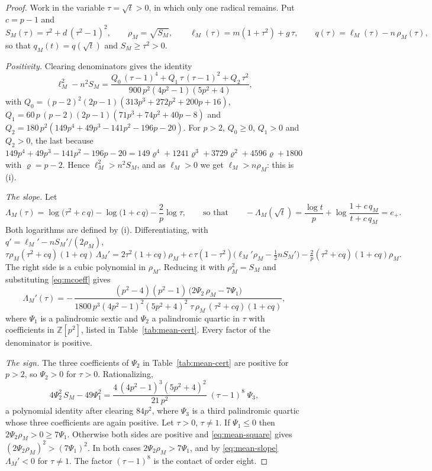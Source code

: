 \begin{proof}
Work in the variable $\tau=\sqrt t>0$, in which only one radical remains. Put $c=p-1$ and
\[ S_M(\tau)=\tau^{2}+d\,(\tau^{2}-1)^{2},\qquad \rho_M=\sqrt{S_M},\qquad
\ell_M(\tau)=m(1+\tau^{2})+g\,\tau,\qquad q(\tau)=\ell_M(\tau)-n\,\rho_M(\tau), \]
so that $q_M(t)=q(\sqrt t)$ and $S_M\ge\tau^{2}>0$.

\emph{Positivity.} Clearing denominators gives the identity
\begin{equation}\label{eq:mean-pos}
\ell_M^{2}-n^{2}S_M=\frac{Q_0\,(\tau-1)^{4}+Q_1\,\tau\,(\tau-1)^{2}+Q_2\,\tau^{2}}{900\,p^{2}(4p^{2}-1)(5p^{2}+4)},
\end{equation}
with $Q_0=(p-2)^{2}(2p-1)(313p^{3}+272p^{2}+200p+16)$,
$Q_1=60\,p\,(p-2)(2p-1)(71p^{3}+74p^{2}+40p-8)$ and
$Q_2=180\,p^{2}(149p^{4}+49p^{3}-141p^{2}-196p-20)$. For $p>2$, $Q_0\ge0$, $Q_1>0$ and $Q_2>0$, the
last because
$149p^{4}+49p^{3}-141p^{2}-196p-20=149\varrho^{4}+1241\varrho^{3}+3729\varrho^{2}+4596\varrho+1800$ with
$\varrho=p-2$. Hence $\ell_M^{2}>n^{2}S_M$, and as $\ell_M>0$ we get $\ell_M>n\rho_M$: this is (i).

\emph{The slope.} Let
\[ \Lambda_M(\tau)=\log\bigl(\tau^{2}+c\,q\bigr)-\log\bigl(1+c\,q\bigr)-\frac2p\log\tau ,
\qquad\text{so that}\qquad -\Lambda_M(\sqrt t)=\frac{\log t}{p}+\log\frac{1+c\,q_M}{t+c\,q_M}=e_+ . \]
Both logarithms are defined by (i). Differentiating, with $q'=\ell_M'-nS_M'/(2\rho_M)$,
\[ \tau\rho_M(\tau^{2}+cq)(1+cq)\,\Lambda_M'
=2\tau^{2}(1+cq)\rho_M+c\,\tau(1-\tau^{2})\bigl(\ell_M'\rho_M-\tfrac12nS_M'\bigr)
-\tfrac2p(\tau^{2}+cq)(1+cq)\rho_M . \]
The right side is a cubic polynomial in $\rho_M$. Reducing it with $\rho_M^{2}=S_M$ and substituting
\eqref{eq:mcoeff} gives
\begin{equation}\label{eq:mean-slope}
\Lambda_M'(\tau)=-\,\frac{(p^{2}-4)(p^{2}-1)\,\bigl(2\Psi_2\,\rho_M-7\Psi_1\bigr)}
{1800\,p^{3}(4p^{2}-1)^{2}(5p^{2}+4)^{2}\;\tau\,\rho_M\,(\tau^{2}+cq)(1+cq)} ,
\end{equation}
where $\Psi_1$ is a palindromic sextic and $\Psi_2$ a palindromic quartic in $\tau$ with coefficients in
$\mathbb Z[p^{2}]$, listed in Table~\ref{tab:mean-cert}. Every factor of the denominator is positive.

\emph{The sign.} The three coefficients of $\Psi_2$ in Table~\ref{tab:mean-cert} are positive for $p>2$,
so $\Psi_2>0$ for $\tau>0$. Rationalizing,
\begin{equation}\label{eq:mean-square}
4\Psi_2^{2}\,S_M-49\Psi_1^{2}=\frac{4\,(4p^{2}-1)^{3}(5p^{2}+4)^{2}}{21\,p^{2}}\;(\tau-1)^{8}\;\Psi_3 ,
\end{equation}
a polynomial identity after clearing $84p^{2}$, where $\Psi_3$ is a third palindromic quartic whose
three coefficients are again positive. Let $\tau>0$, $\tau\ne1$. If $\Psi_1\le0$ then
$2\Psi_2\rho_M>0\ge7\Psi_1$. Otherwise both sides are positive and \eqref{eq:mean-square} gives
$(2\Psi_2\rho_M)^{2}>(7\Psi_1)^{2}$. In both cases $2\Psi_2\rho_M>7\Psi_1$, and by
\eqref{eq:mean-slope} $\Lambda_M'<0$ for $\tau\neq1$. The factor $(\tau-1)^{8}$ is the contact of order
eight.


\end{proof}
